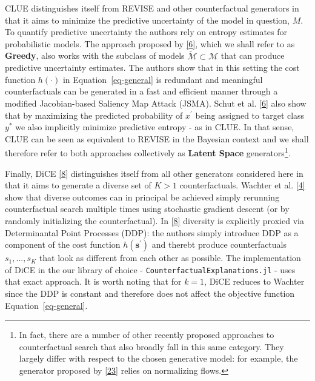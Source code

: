 \documentclass[
  conference]{IEEEtran}
\begin{document}
CLUE distinguishes itself from REVISE and other counterfactual
generators in that it aims to minimize the predictive uncertainty of the
model in question, \(M\). To quantify predictive uncertainty the authors
rely on entropy estimates for probabilistic models. The approach
proposed by \protect\hyperlink{ref-schut2021generating}{{[}6{]}}, which
we shall refer to as \textbf{Greedy}, also works with the subclass of
models \(\tilde{\mathcal{M}}\subset\mathcal{M}\) that can produce
predictive uncertainty estimates. The authors show that in this setting
the cost function \(h(\cdot)\) in Equation~\ref{eq-general} is redundant
and meaningful counterfactuals can be generated in a fast and efficient
manner through a modified Jacobian-based Saliency Map Attack (JSMA).
Schut et al. \protect\hyperlink{ref-schut2021generating}{{[}6{]}} also
show that by maximizing the predicted probability of \(x^\prime\) being
assigned to target class \(y^*\) we also implicitly minimize predictive
entropy - as in CLUE. In that sense, CLUE can be seen as equivalent to
REVISE in the Bayesian context and we shall therefore refer to both
approaches collectively as \textbf{Latent Space} generators\footnote{In
  fact, there are a number of other recently proposed approaches to
  counterfactual search that also broadly fall in this same category.
  They largely differ with respect to the chosen generative model: for
  example, the generator proposed by
  \protect\hyperlink{ref-dombrowski2021diffeomorphic}{{[}23{]}} relies
  on normalizing flows.}.

Finally, DiCE \protect\hyperlink{ref-mothilal2020explaining}{{[}8{]}}
distinguishes itself from all other generators considered here in that
it aims to generate a diverse set of \(K>1\) counterfactuals. Wachter et
al. \protect\hyperlink{ref-wachter2017counterfactual}{{[}4{]}} show that
diverse outcomes can in principal be achieved simply rerunning
counterfactual search multiple times using stochastic gradient descent
(or by randomly initializing the counterfactual). In
\protect\hyperlink{ref-mothilal2020explaining}{{[}8{]}} diversity is
explicitly proxied via Determinantal Point Processes (DDP): the authors
simply introduce DDP as a component of the cost function
\(h(\mathbf{s}^\prime)\) and therebt produce counterfactuals
\(s_1, ... , s_K\) that look as different from each other as possible.
The implementation of DiCE in the our library of choice -
\texttt{CounterfactualExplanations.jl} - uses that exact approach. It is
worth noting that for \(k=1\), DiCE reduces to Wachter since the DDP is
constant and therefore does not affect the objective function
Equation~\ref{eq-general}.
\end{document}

